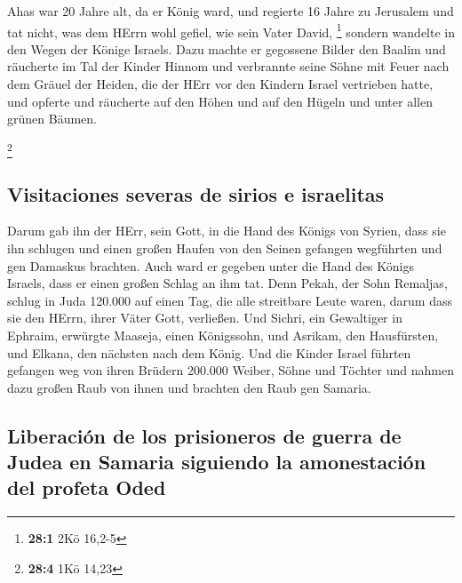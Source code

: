  Ahas war 20 Jahre alt, da er König ward, und regierte 16
Jahre zu Jerusalem und tat nicht, was dem HErrn wohl gefiel, wie sein
Vater David, \footnote{\textbf{28:1} 2Kö 16,2-5}  sondern
wandelte in den Wegen der Könige Israels. Dazu machte er gegossene
Bilder den Baalim  und räucherte im Tal der Kinder Hinnom
und verbrannte seine Söhne mit Feuer nach dem Gräuel der Heiden, die der
HErr vor den Kindern Israel vertrieben hatte,  und opferte
und räucherte auf den Höhen und auf den Hügeln und unter allen grünen
Bäumen.

\footnote{\textbf{28:4} 1Kö 14,23}

\hypertarget{visitaciones-severas-de-sirios-e-israelitas}{%
\subsection{Visitaciones severas de sirios e
israelitas}\label{visitaciones-severas-de-sirios-e-israelitas}}

 Darum gab ihn der HErr, sein Gott, in die Hand des Königs
von Syrien, dass sie ihn schlugen und einen großen Haufen von den Seinen
gefangen wegführten und gen Damaskus brachten. Auch ward er gegeben
unter die Hand des Königs Israels, dass er einen großen Schlag an ihm
tat.  Denn Pekah, der Sohn Remaljas, schlug in Juda
120.000 auf einen Tag, die alle streitbare Leute waren, darum dass sie
den HErrn, ihrer Väter Gott, verließen.  Und Sichri, ein
Gewaltiger in Ephraim, erwürgte Maaseja, einen Königssohn, und Asrikam,
den Hausfürsten, und Elkana, den nächsten nach dem König. 
Und die Kinder Israel führten gefangen weg von ihren Brüdern 200.000
Weiber, Söhne und Töchter und nahmen dazu großen Raub von ihnen und
brachten den Raub gen Samaria.

\hypertarget{liberaciuxf3n-de-los-prisioneros-de-guerra-de-judea-en-samaria-siguiendo-la-amonestaciuxf3n-del-profeta-oded}{%
\subsection{Liberación de los prisioneros de guerra de Judea en Samaria
siguiendo la amonestación del profeta
Oded}\label{liberaciuxf3n-de-los-prisioneros-de-guerra-de-judea-en-samaria-siguiendo-la-amonestaciuxf3n-del-profeta-oded}}

